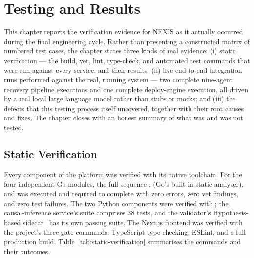 \chapter{Testing and Results}

This chapter reports the verification evidence for NEXIS as it actually
occurred during the final engineering cycle. Rather than presenting a
constructed matrix of numbered test cases, the chapter states three kinds of
real evidence: (i) static verification --- the build, vet, lint, type-check,
and automated test commands that were run against every service, and their
results; (ii) live end-to-end integration runs performed against the real,
running system --- two complete nine-agent recovery pipeline executions and
one complete deploy-engine execution, all driven by a real local large
language model rather than stubs or mocks; and (iii) the defects that this
testing process itself uncovered, together with their root causes and fixes.
The chapter closes with an honest summary of what was and was not tested.

\section{Static Verification}

Every component of the platform was verified with its native toolchain. For
the four independent Go modules, the full sequence ,
 (Go's built-in static analyser), and 
was executed and required to complete with zero errors, zero vet findings,
and zero test failures. The two Python components were verified with
; the causal-inference service's suite comprises 38 tests, and
the validator's Hypothesis-based sidecar~\cite{hypothesis} has its own
passing suite. The Next.js frontend was verified with the project's three
gate commands: TypeScript type checking, ESLint, and a full production
build. Table~\ref{tab:static-verification} summarises the commands and
their outcomes.

